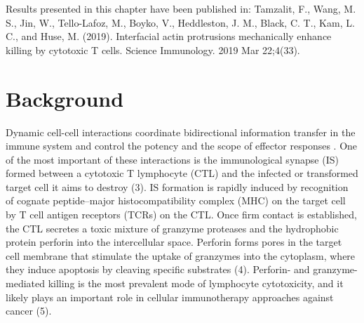 Results presented in this chapter have been published in: Tamzalit, F., Wang, M. S., Jin, W., Tello-Lafoz, M., Boyko, V., Heddleston, J. M., Black, C. T., Kam, L. C., and Huse, M. (2019). Interfacial actin protrusions mechanically enhance killing by cytotoxic T cells. Science Immunology. 2019 Mar 22;4(33).

\section{Background}
Dynamic cell-cell interactions coordinate bidirectional information transfer in the immune system and control the potency and the scope of effector responses \cite{Batista2013}. One of the most important of these interactions is the immunological synapse (IS) formed between a cytotoxic T lymphocyte (CTL) and the infected or transformed target cell it aims to destroy \cite{Dustin2010} (3). IS formation is rapidly induced by recognition of cognate peptide–major histocompatibility complex (MHC) on the target cell by T cell antigen receptors (TCRs) on the CTL. Once firm contact is established, the CTL secretes a toxic mixture of granzyme proteases and the hydrophobic protein perforin into the intercellular space. Perforin forms pores in the target cell membrane that stimulate the uptake of granzymes into the cytoplasm, where they induce apoptosis by cleaving specific substrates (4). Perforin- and granzyme- mediated killing is the most prevalent mode of lymphocyte cytotoxicity, and it likely plays an important role in cellular immunotherapy approaches against cancer (5).

